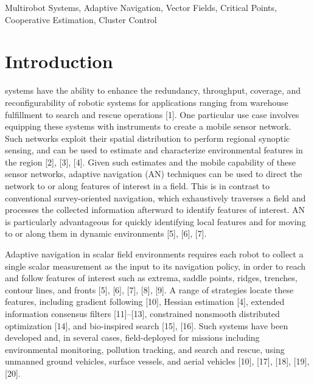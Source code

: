 \documentclass[lettersize,journal]{IEEEtran}
\begin{document}
\begin{IEEEkeywords}
Multirobot Systems, Adaptive Navigation, Vector Fields, Critical Points, Cooperative Estimation, Cluster Control
\end{IEEEkeywords}


\section{Introduction}

 systems have the ability to enhance the redundancy, throughput, coverage, and reconfigurability of robotic systems for applications ranging from warehouse fulfillment to search and rescue operations [1]. One particular use case involves equipping these systems with instruments to create a mobile sensor network. Such networks exploit their spatial distribution to perform regional synoptic sensing, and can be used to estimate and characterize environmental features in the region [2], [3], [4]. Given such estimates and the mobile capability of these sensor networks, adaptive navigation (AN) techniques can be used to direct the network to or along features of interest in a field. This is in contrast to conventional survey-oriented navigation, which exhaustively traverses a field and processes the collected information afterward to identify features of interest. AN is particularly advantageous for quickly identifying local features and for moving to or along them in dynamic environments [5], [6], [7].

Adaptive navigation in scalar field environments requires each robot to collect a single scalar measurement as the input to its navigation policy, in order to reach and follow features of interest such as extrema, saddle points, ridges, trenches, contour lines, and fronts [5], [6], [7], [8], [9]. A range of strategies locate these features, including gradient following [10], Hessian estimation [4], extended information consensus filters [11]--[13], constrained nonsmooth distributed optimization [14], and bio-inspired search [15], [16]. Such systems have been developed and, in several cases, field-deployed for missions including environmental monitoring, pollution tracking, and search and rescue, using unmanned ground vehicles, surface vessels, and aerial vehicles [10], [17], [18], [19], [20].
\end{document}
